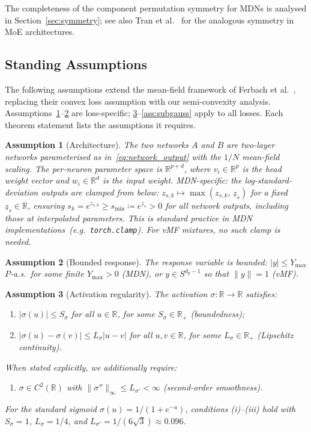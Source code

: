 \documentclass[11pt]{article}
\newtheorem{assumption}{Assumption}
\newcommand{\R}{\mathbb{R}}
\begin{document}
The completeness of the component permutation symmetry for MDNs
is analysed in Section~\ref{sec:symmetry};
see also Tran et al.~\cite{tran2025moe} for the analogous
symmetry in MoE architectures.

\subsection{Standing Assumptions}\label{sec:assumptions}

The following assumptions extend the mean-field framework
of Ferbach et al.~\cite{ferbach2024}, replacing
their convex loss assumption with our semi-convexity analysis.
Assumptions~\ref{ass:arch}--\ref{ass:bdd_resp} are loss-specific;
\ref{ass:activ}--\ref{ass:subgauss} apply to all losses.
Each theorem statement lists the assumptions it requires.

\begin{assumption}[Architecture]\label{ass:arch}
The two networks $A$ and $B$ are two-layer networks parameterised
as in~\eqref{eq:network_output} with the $1/N$ mean-field scaling.
The per-neuron parameter space is $\R^{p+d}$, where $v_i \in \R^p$
is the head weight vector and $w_i \in \R^d$ is the input weight.
\emph{MDN-specific:}
the log-standard-deviation outputs are clamped from below:
$z_{s,k} \mapsto \max(z_{s,k},\,\underline{z}_s)$ for a fixed
$\underline{z}_s \in \R$, ensuring
$s_k = e^{z_{s,k}} \ge s_{\min} \coloneqq e^{\underline{z}_s} > 0$ for
\emph{all} network outputs, including those at interpolated parameters.
This is standard practice in MDN
implementations~(e.g.\ \texttt{torch.clamp}).
For vMF mixtures, no such clamp is needed.
\end{assumption}

\begin{assumption}[Bounded response]\label{ass:bdd_resp}
The response variable is bounded: $|y| \le Y_{\max}$ $P$-a.s.\
for some finite $Y_{\max} > 0$ (MDN), or
$y \in S^{d_y-1}$ so that $\|y\| = 1$ (vMF).
\end{assumption}

\begin{assumption}[Activation regularity]\label{ass:activ}
The activation $\sigma:\R\to\R$ satisfies:
\begin{enumerate}[label=(\roman*),leftmargin=*,itemsep=0pt]
  \item $|\sigma(u)| \le S_\sigma$ for all $u\in\R$, for some $S_\sigma \in \R_+$
    (boundedness);
  \item $|\sigma(u) - \sigma(v)| \le L_\sigma|u-v|$ for all $u,v\in\R$,
    for some $L_\sigma \in \R_+$ (Lipschitz continuity).
\end{enumerate}
When stated explicitly, we additionally require:
\begin{enumerate}[label=(\roman*),leftmargin=*,itemsep=0pt,start=3]
  \item $\sigma \in C^2(\R)$ with
    $\|\sigma''\|_\infty \le L_{\sigma'} < \infty$
    (second-order smoothness).
\end{enumerate}
For the standard sigmoid $\sigma(u) = 1/(1+e^{-u})$, conditions (i)--(iii) hold with
$S_\sigma = 1$, $L_\sigma = 1/4$, and
$L_{\sigma'} = 1/(6\sqrt{3}) \approx 0.096$.
\end{assumption}
\end{document}
